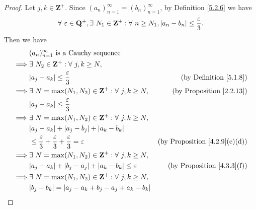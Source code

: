 \begin{proof}
    Let \(j, k \in \mathbf{Z}^+\).
    Since \((a_n)_{n = 1}^\infty = (b_n)_{n = 1}^\infty\), by Definition \ref{5.2.6} we have
    \[
        \forall\ \varepsilon \in \mathbf{Q}^+, \exists\ N_1 \in \mathbf{Z}^+ : \forall\ n \geq N_1, \abs*{a_n - b_n} \leq \frac{\varepsilon}{3}.
    \]
    Then we have
    \begin{align*}
                 & (a_n)_{n = 1}^\infty \text{ is a Cauchy sequence}                                                                                    \\
        \implies & \exists\ N_2 \in \mathbf{Z}^+ : \forall\ j, k \geq N,                                                                                \\
                 & \abs*{a_j - a_k} \leq \frac{\varepsilon}{3}                                              & \text{(by Definition \ref{5.1.8})}        \\
        \implies & \exists\ N = \max(N_1, N_2) \in \mathbf{Z}^+ : \forall\ j, k \geq N,                     & \text{(by Proposition \ref{2.2.13})}      \\
                 & \abs*{a_j - a_k} \leq \frac{\varepsilon}{3}                                                                                          \\
        \implies & \exists\ N = \max(N_1, N_2) \in \mathbf{Z}^+ : \forall\ j, k \geq N,                                                                 \\
                 & \abs*{a_j - a_k} + \abs*{a_j - b_j} + \abs*{a_k - b_k}                                                                               \\
                 & \leq \frac{\varepsilon}{3} + \frac{\varepsilon}{3} + \frac{\varepsilon}{3} = \varepsilon & \text{(by Proposition \ref{4.2.9}(c)(d))} \\
        \implies & \exists\ N = \max(N_1, N_2) \in \mathbf{Z}^+ : \forall\ j, k \geq N,                                                                 \\
                 & \abs*{a_j - a_k} + \abs*{b_j - a_j} + \abs*{a_k - b_k} \leq \varepsilon                  & \text{(by Proposition \ref{4.3.3}(f))}    \\
        \implies & \exists\ N = \max(N_1, N_2) \in \mathbf{Z}^+ : \forall\ j, k \geq N,                                                                 \\
                 & \abs*{b_j - b_k} = \abs*{a_j - a_k + b_j - a_j + a_k - b_k}                                                                          \\

\end{align*}
\end{proof}
